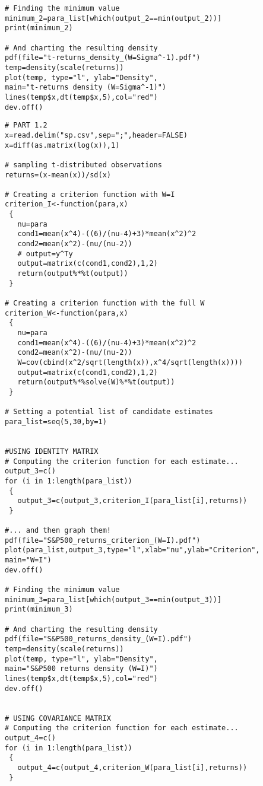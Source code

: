 \begin{appendices}
\begin{verbatim}
# Finding the minimum value
minimum_2=para_list[which(output_2==min(output_2))]
print(minimum_2)

# And charting the resulting density
pdf(file="t-returns_density_(W=Sigma^-1).pdf")
temp=density(scale(returns))
plot(temp, type="l", ylab="Density",
main="t-returns density (W=Sigma^-1)")
lines(temp$x,dt(temp$x,5),col="red")
dev.off()
\end{verbatim}

\newpage
\begin{verbatim}
# PART 1.2
x=read.delim("sp.csv",sep=";",header=FALSE)
x=diff(as.matrix(log(x)),1)

# sampling t-distributed observations
returns=(x-mean(x))/sd(x)
       
# Creating a criterion function with W=I
criterion_I<-function(para,x)
 {
   nu=para
   cond1=mean(x^4)-((6)/(nu-4)+3)*mean(x^2)^2
   cond2=mean(x^2)-(nu/(nu-2))
   # output=y^Ty
   output=matrix(c(cond1,cond2),1,2)
   return(output%*%t(output))
 }
       
# Creating a criterion function with the full W
criterion_W<-function(para,x)
 {
   nu=para
   cond1=mean(x^4)-((6)/(nu-4)+3)*mean(x^2)^2
   cond2=mean(x^2)-(nu/(nu-2))
   W=cov(cbind(x^2/sqrt(length(x)),x^4/sqrt(length(x))))
   output=matrix(c(cond1,cond2),1,2)
   return(output%*%solve(W)%*%t(output))
 }
       
# Setting a potential list of candidate estimates
para_list=seq(5,30,by=1)
     
     
#USING IDENTITY MATRIX
# Computing the criterion function for each estimate...
output_3=c()
for (i in 1:length(para_list))
 {
   output_3=c(output_3,criterion_I(para_list[i],returns))
 }
       
#... and then graph them!
pdf(file="S&P500_returns_criterion_(W=I).pdf")
plot(para_list,output_3,type="l",xlab="nu",ylab="Criterion",
main="W=I")
dev.off()

# Finding the minimum value
minimum_3=para_list[which(output_3==min(output_3))]
print(minimum_3)
       
# And charting the resulting density
pdf(file="S&P500_returns_density_(W=I).pdf")
temp=density(scale(returns))
plot(temp, type="l", ylab="Density", 
main="S&P500 returns density (W=I)")
lines(temp$x,dt(temp$x,5),col="red")       
dev.off()


# USING COVARIANCE MATRIX
# Computing the criterion function for each estimate...
output_4=c()
for (i in 1:length(para_list))
 {
   output_4=c(output_4,criterion_W(para_list[i],returns))
 }
       

\end{verbatim}
\end{appendices}
